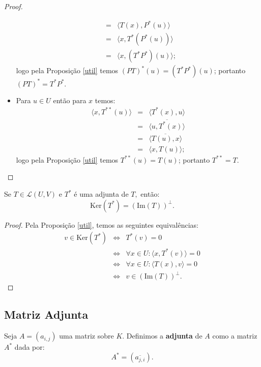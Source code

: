 \documentclass[11pt,twoside,a4paper]{book}
\begin{document}
\begin{proof}
\begin{itemize}
\[\begin{array}{rcl}
&=&\langle T(x),P^*(u)\rangle\\
&=&\langle x,T^*(P^*(u))\rangle\\
&=&\langle x,(T^*P^*)(u)\rangle;
\end{array}
\]
logo pela Proposição \ref{util} temos $(PT)^*(u)=(T^*P^*)(u)$; portanto $(PT)^*=T^*P^*.$
\item Para $u\in U$ então para $x$ temos:
\[
\begin{array}{rcl}
\langle x,T^{**}(u)\rangle&=&\langle T^*(x),u\rangle\\
&=&\overline{\langle u,T^*(x)\rangle}\\
&=&\overline{\langle T(u),x\rangle}\\
&=&\langle x,T(u)\rangle;
\end{array}
\]
logo pela Proposição \ref{util} temos $T^{**}(u)=T(u)$; portanto $T^{**}=T.$
\end{itemize}
\end{proof}

\begin{proposicao}\label{keradjunto}
Se $T\in\mathcal{L}(U,V)$ e $T^*$ é uma adjunta de $T,$ então:
\[
\mathrm{Ker}(T^*)=(\mathrm{Im}(T))^\perp.
\]
\end{proposicao}
\begin{proof}
Pela Proposição \ref{util}, temos as seguintes equivalências:
\[
\begin{array}{rcl}
v\in\mathrm{Ker}(T^*)&\Leftrightarrow& T^*(v)=0\\
&\Leftrightarrow&\forall x\in U:\langle x,T^*(v)\rangle=0\\
&\Leftrightarrow&\forall x\in U:\langle T(x),v\rangle=0\\
&\Leftrightarrow&v\in(\mathrm{Im}(T))^\perp.
\end{array}
\]
\end{proof}

\subsection{Matriz Adjunta}

\begin{definicao}
Seja $A=(a_{i,j})$ uma matriz sobre $K$. Definimos a \textbf{adjunta} de $A$ como a matriz $A^*$ dada por:
\[
A^*=(\overline{a_{j,i}}).
\]
\end{definicao}
\end{document}
